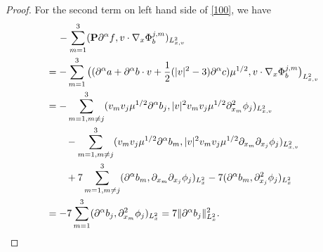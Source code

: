 \documentclass[reqno,a4paper]{amsart}
\numberwithin{equation}{section}
\newcommand{\1}{\mathbf{1}}
\renewcommand{\P}{\mathbf{P}}
\newcommand{\dis}{\displaystyle}
\newcommand{\pa}{\partial}
\newcommand{\na}{\nabla}
\newcommand{\<}{\langle}
\renewcommand{\>}{\rangle}
\newcommand{\I}{\mathbf{I}}
\renewcommand{\P}{\mathbf{P}}
\begin{document}
\begin{proof}
For the second term on left hand side of \eqref{100}, we have  
		\begin{align}\label{3.30}\notag
			&\quad\,-\sum^3_{m=1}(\P {\partial^\alpha f},v\cdot \na_x{\Phi^{j,m}_b})_{L^2_{x,v}}\\
			&\notag=-\sum^3_{m=1}\big(({\partial^\alpha a}+{\partial^\alpha b}\cdot v+\frac{1}{2}(|v|^2-3){\partial^\alpha c})\mu^{1/2},v\cdot{\nabla_x\Phi^{j,m}_b}\big)_{L^2_{x,v}}\\
			\notag&=-\sum^{3}_{m=1,m\neq j}(v_mv_j\mu^{1/2}{\partial^\alpha b_j},|v|^2v_mv_j\mu^{1/2}{\partial_{x_m}^2\phi_j})_{L^2_{x,v}}\\
			&\notag\qquad-\sum^{3}_{m=1,m\neq j}(v_mv_j\mu^{1/2}{\partial^\alpha b_m},|v|^2v_mv_j\mu^{1/2}{\partial_{x_m}\partial_{x_j}\phi_j})_{L^2_{x,v}}\\
			&\notag\qquad+7\sum^{3}_{m=1,m\neq j}({\partial^\alpha b_m},{\partial_{x_m}\partial_{x_j}\phi_j})_{L^2_{x}}-7({\partial^\alpha b_m},{\partial^2_{x_j}\phi_j})_{L^2_{x}}\\
			&= -7 \sum^3_{m=1}({\partial^\alpha b_j},{\partial_{x_m}^2\phi_j})_{L^2_{x}}=7\|{\partial^\alpha b_j}\|^2_{L^2_{x}}.
		\end{align}
%
%
%

\end{proof}
\end{document}
